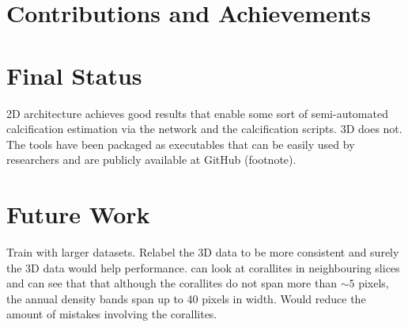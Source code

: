 \section{Contributions and Achievements}

\section{Final Status}

2D architecture achieves good results that enable some sort of semi-automated calcification estimation via the network and the calcification scripts. 3D does not. The tools have been packaged as executables that can be easily used by researchers and are publicly available at GitHub (footnote). 

\section{Future Work}

Train with larger datasets. Relabel the 3D data to be more consistent and surely the 3D data would help performance. can look at corallites in neighbouring slices and can see that that although the corallites do not span more than ${\sim}5$ pixels, the annual density bands span up to 40 pixels in width. Would reduce the amount of mistakes involving the corallites.




